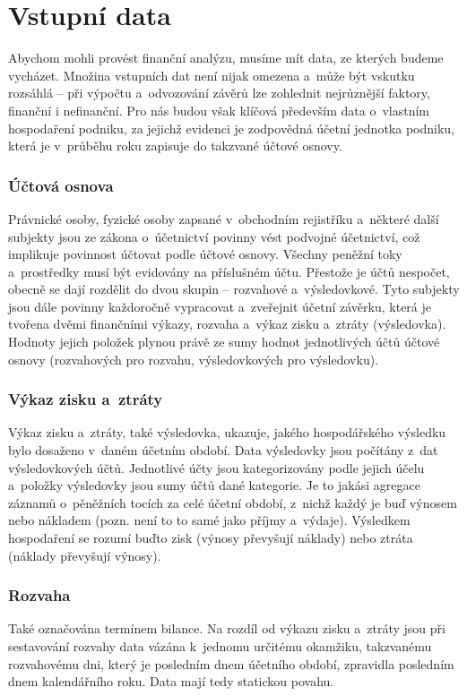 \section{Vstupní data}
Abychom mohli provést finanční analýzu, musíme mít data, ze kterých budeme vycházet. Množina vstupních dat není nijak omezena a~může být vskutku rozsáhlá -- při výpočtu a~odvozování závěrů lze zohlednit nejrůznější faktory, finanční i nefinanční. Pro nás budou však klíčová především data o~vlastním hospodaření podniku, za jejichž evidenci je zodpovědná účetní jednotka podniku, která je v~průběhu roku zapisuje do takzvané účtové osnovy.

\subsubsection{Účtová osnova}
Právnické osoby, fyzické osoby zapsané v~obchodním rejistříku a~některé další subjekty jsou ze zákona o~účetnictví povinny vést podvojné účetnictví, což implikuje povinnost účtovat podle účtové osnovy.
Všechny peněžní toky a~prostředky musí být evidovány na příslušném účtu. Přestože je účtů nespočet, obecně se dají rozdělit do dvou skupin -- rozvahové a~výsledovkové. Tyto subjekty jsou dále povinny každoročně vypracovat a~zveřejnit účetní závěrku, která je tvořena dvěmi finančními výkazy, rozvaha a~výkaz zisku a~ztráty (výsledovka).
Hodnoty jejich položek plynou právě ze sumy hodnot jednotlivých účtů účtové osnovy (rozvahových pro rozvahu, výsledovkových pro výsledovku).

\subsubsection{Výkaz zisku a~ztráty}
Výkaz zisku a~ztráty, také výsledovka, ukazuje, jakého hospodářského výsledku bylo dosaženo v~daném účetním období. Data výsledovky jsou počítány z~dat výsledovkových účtů. Jednotlivé účty jsou kategorizovány podle jejich účelu a~položky výsledovky jsou sumy účtů dané kategorie. Je to jakási agregace záznamů o~pěněžních tocích za celé účetní období, z~nichž každý je buď výnosem nebo nákladem (pozn. není to to samé jako příjmy a~výdaje). Výsledkem hospodaření se rozumí buďto zisk (výnosy převyšují náklady) nebo ztráta (náklady převyšují výnosy).

\subsubsection{Rozvaha}
Také označována termínem bilance. Na rozdíl od výkazu zisku a~ztráty jsou při sestavování rozvahy data vázána k~jednomu určitému okamžiku, takzvanému rozvahovému dni, který je posledním dnem účetního období, zpravidla posledním dnem kalendářního roku. Data mají tedy statickou povahu.

